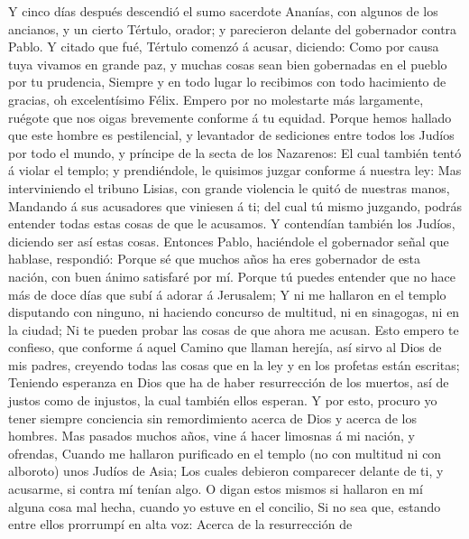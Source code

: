  Y cinco días después descendió el sumo sacerdote Ananías,
con algunos de los ancianos, y un cierto Tértulo, orador; y parecieron
delante del gobernador contra Pablo.  Y citado que fué,
Tértulo comenzó á acusar, diciendo: Como por causa tuya vivamos en
grande paz, y muchas cosas sean bien gobernadas en el pueblo por tu
prudencia,  Siempre y en todo lugar lo recibimos con todo
hacimiento de gracias, oh excelentísimo Félix.  Empero por
no molestarte más largamente, ruégote que nos oigas brevemente conforme
á tu equidad.  Porque hemos hallado que este hombre es
pestilencial, y levantador de sediciones entre todos los Judíos por todo
el mundo, y príncipe de la secta de los Nazarenos:  El cual
también tentó á violar el templo; y prendiéndole, le quisimos juzgar
conforme á nuestra ley:  Mas interviniendo el tribuno
Lisias, con grande violencia le quitó de nuestras manos, 
Mandando á sus acusadores que viniesen á ti; del cual tú mismo juzgando,
podrás entender todas estas cosas de que le acusamos.  Y
contendían también los Judíos, diciendo ser así estas cosas.
 Entonces Pablo, haciéndole el gobernador señal que
hablase, respondió: Porque sé que muchos años ha eres gobernador de esta
nación, con buen ánimo satisfaré por mí.  Porque tú puedes
entender que no hace más de doce días que subí á adorar á Jerusalem;
 Y ni me hallaron en el templo disputando con ninguno, ni
haciendo concurso de multitud, ni en sinagogas, ni en la ciudad;
 Ni te pueden probar las cosas de que ahora me acusan.
 Esto empero te confieso, que conforme á aquel Camino que
llaman herejía, así sirvo al Dios de mis padres, creyendo todas las
cosas que en la ley y en los profetas están escritas; 
Teniendo esperanza en Dios que ha de haber resurrección de los muertos,
así de justos como de injustos, la cual también ellos esperan.
 Y por esto, procuro yo tener siempre conciencia sin
remordimiento acerca de Dios y acerca de los hombres.  Mas
pasados muchos años, vine á hacer limosnas á mi nación, y ofrendas,
 Cuando me hallaron purificado en el templo (no con
multitud ni con alboroto) unos Judíos de Asia;  Los cuales
debieron comparecer delante de ti, y acusarme, si contra mí tenían algo.
 O digan estos mismos si hallaron en mí alguna cosa mal
hecha, cuando yo estuve en el concilio,  Si no sea que,
estando entre ellos prorrumpí en alta voz: Acerca de la resurrección de

